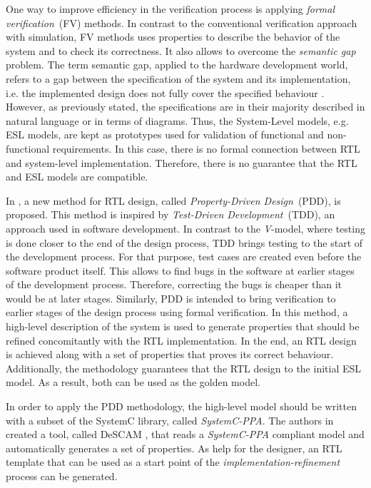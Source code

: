 One way to improve efficiency in the verification process is applying \textit{formal verification}~(FV) methods. In contrast to the conventional verification approach with simulation, FV methods uses properties to describe the behavior of the system and to check its correctness. It also allows to overcome the \textit{semantic gap} problem. The term semantic gap, applied to the hardware development world, refers to a gap between the specification of the system and its implementation, i.e. the implemented design does not fully cover the specified behaviour  . However, as previously stated, the specifications are in their majority described in natural language or in terms of diagrams. Thus, the System-Level models, e.g. ESL models, are kept as prototypes used for validation of functional and non-functional requirements. In this case, there is no formal connection between RTL and system-level implementation. Therefore, there is no guarantee that the RTL and ESL models are compatible.

In \cite{paper-pdd}, a new method for RTL design, called \textit{Property-Driven Design}~(PDD), is proposed. This method is inspired by \textit{Test-Driven Development}~(TDD), an approach used in software development. In contrast to the \textit{V}-model, where testing is done closer to the end of the design process, TDD brings testing to the start of the development process. For that purpose, test cases are created even before the software product itself. This allows to find bugs in the software at earlier stages of the development process. Therefore, correcting the bugs is cheaper than it would be at later stages. Similarly, PDD is intended to bring verification to earlier stages of the design process using formal verification. In this method, a high-level description of the system is used to generate properties that should be refined concomitantly with the RTL implementation. In the end, an RTL design is achieved along with a set of properties that proves its correct behaviour. Additionally, the methodology guarantees that the  RTL design   to the initial ESL model. As a result, both can be used as the golden model.

In order to apply the PDD methodology, the high-level model should be written with a subset of the SystemC \cite{lib-systemc} library, called \textit{SystemC-PPA}. The authors in \cite{paper-pdd} created a tool, called DeSCAM \cite{descam}, that reads a \textit{SystemC-PPA} compliant model and automatically generates a set of properties. As help for the designer, an RTL template that can be used as a start point of the \textit{implementation-refinement} process can be generated.

